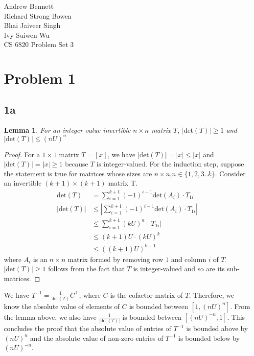 \documentclass{article}
\newtheorem{lemma}{Lemma}
\begin{document}
\begin{flushright}
Andrew Bennett\\
Richard Strong Bowen\\
Bhai Jaiveer Singh\\
Ivy Suiwen Wu\\
CS 6820 Problem Set 3
\end{flushright}
\section*{Problem 1}
\subsection*{1a}
\begin{lemma} For an integer-value invertible $n\times n$ matrix $T$, $|\text{det}(T)| \geq 1$ and  $|\text{det}(T)| \leq (nU)^n$ \end{lemma}\begin{proof} For a $1\times 1$ matrix $T = [x]$, we have $|\text{det}(T)|= |x|\leq |x|$ and $|\text{det}(T)| = |x| \geq 1$ because $T$ is integer-valued. For the induction step, suppose the statement is true for matrices whose sizes are $n\times n$,$n\in\{1,2,3..k\}$. Consider an invertible $(k+1)\times(k+1)$ matrix T. 
\begin{align*}
\text{det}(T) &= \sum_{i=1}^{k+1} (-1)^{i-1}\text{det}(A_i)\cdot T_{1i}\\
|\text{det}(T)|&\leq |\sum_{i=1}^{k+1} (-1)^{i-1}\text{det}(A_i)\cdot T_{1i}|\\
&\leq \sum_{i=1}^{k+1}(kU)^{n}\cdot |T_{1i}|\\
&\leq(k+1)U\cdot (kU)^{k}\\
&\leq ((k+1)U)^{k+1}
\end{align*}
where $A_i$ is an $n\times n$ matrix formed by removing row $1$ and column $i$ of $T$. $|\text{det}(T)|\geq 1$ follows from the fact that $T$ is integer-valued and so are its sub-matrices. \end{proof}
We have $T^{-1} = \frac{1}{\text{det}(T)}C^{\intercal}$, where $C$ is the cofactor matrix of $T$. Therefore, we know the absolute value of elements of $C$ is bounded between $[1, (nU)^{n}]$. From the lemma above, we also have $\frac{1}{|\text{det}(T)|}$ is bounded between $[(nU)^{-n},1]$. This concludes the proof that the absolute value of entries of $T^{-1}$ is bounded above by $(nU)^{n}$ and the absolute value of non-zero entries of $T^{-1}$ is bounded below by $(nU)^{-n}$.
\end{document}
